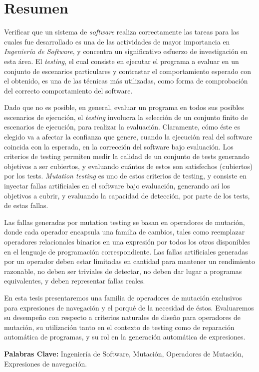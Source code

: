 \chapter*{Resumen}
Verificar que un sistema de \emph{software} realiza correctamente las tareas para las cuales fue desarrollado es una de las actividades de mayor importancia en \emph{Ingenier\'ia de Software}, y concentra un significativo esfuerzo de investigaci\'on en esta \'area. El \emph{testing}, el cual consiste en ejecutar el programa a evaluar en un conjunto de escenarios particulares y contrastar el comportamiento esperado con el obtenido, es una de las t\'ecnicas m\'as utilizadas, como forma de comprobaci\'on del correcto comportamiento del software.

Dado que no es posible, en general, evaluar un programa en todos sus posibles escenarios de ejecuci\'on, el \emph{testing} involucra la selecci\'on de un conjunto finito de escenarios de ejecuci\'on, para realizar la evaluaci\'on. Claramente, c\'omo \'este es elegido va a afectar la confianza que genere, cuando la ejecuci\'on real del software coincida con la esperada, en la correcci\'on del software bajo evaluaci\'on. Los criterios de testing permiten medir la calidad de un conjunto de tests generando objetivos a ser cubiertos, y evaluando cu\'antos de estos son satisfechos (cubiertos) por los tests. \emph{Mutation testing} es uno de estos criterios de testing, y consiste en inyectar fallas artificiales en el software bajo evaluaci\'on, generando as\'i los objetivos a cubrir, y evaluando la capacidad de detecci\'on, por parte de los tests, de estas fallas.

Las fallas generadas por mutation testing se basan en operadores de mutaci\'on, donde cada operador encapsula una familia de cambios, tales como reemplazar operadores relacionales binarios en una expresi\'on por todos los otros disponibles en el lenguaje de programaci\'on correspondiente. Las fallas artificiales generadas por un operador deben estar limitadas en cantidad para mantener un rendimiento razonable, no deben ser triviales de detectar, no deben dar lugar a programas equivalentes, y deben representar fallas reales.

En esta tesis presentaremos una familia de operadores de mutaci\'on exclusivos para expresiones de navegaci\'on y el porqu\'e de la necesidad de \'estos. Evaluaremos su desempe\~no con respecto a criterios naturales de dise\~no para operadores de mutaci\'on, su utilizaci\'on tanto en el contexto de testing como de reparaci\'on autom\'atica de programas, y su rol en la generaci\'on autom\'atica de expresiones.

\noindent
\textbf{Palabras Clave:} Ingenier\'ia de Software, Mutaci\'on, Operadores de Mutaci\'on, Expresiones de navegaci\'on.






